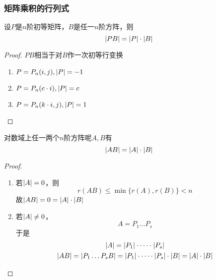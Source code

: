 \documentclass[11pt]{article}
\begin{document}
\subsubsection{矩阵乘积的行列式}
\label{sec:org17de9aa}
\begin{proposition}[]
设\(P\)是\(n\)阶初等矩阵，\(B\)是任一\(n\)阶方阵，则
\begin{equation*}
\abs{PB}=\abs{P}\cdot\abs{B}
\end{equation*}
\end{proposition}

\begin{proof}
\(PB\)相当于对\(B\)作一次初等行变换
\begin{enumerate}
\item \(P=P_n(i,j),\abs{P}=-1\)
\item \(P=P_n(c\cdot i),\abs{P}=c\)
\item \(P=P_n(k\cdot i,j),\abs{P}=1\)
\end{enumerate}
\end{proof}

\begin{theorem}[]
对数域上任一两个\(n\)阶方阵呢\(A,B\)有
\begin{equation*}
\abs{AB}=\abs{A}\cdot\abs{B}
\end{equation*}
\end{theorem}
\begin{proof}
\begin{enumerate}
\item 若\(\abs{A}=0\)，则
\begin{equation*}
r(AB)\le\min\{r(A),r(B)\}<n
\end{equation*}
故\(\abs{AB}=0=\abs{A}\cdot\abs{B}\)
\item 若\(\abs{A}\neq0\)，
\begin{equation*}
A=P_1\dots P_s
\end{equation*}
于是
\begin{gather*}
\abs{A}=\abs{P_1}\cdot\dots\cdot\abs{P_s}\\
\abs{AB}=\abs{P_1\dots P_sB}=\abs{P_1}\cdot\dots\cdot\abs{P_s}\cdot\abs{B}=\abs{A}\cdot\abs{B}
\end{gather*}
\end{enumerate}
\end{proof}
\end{document}

